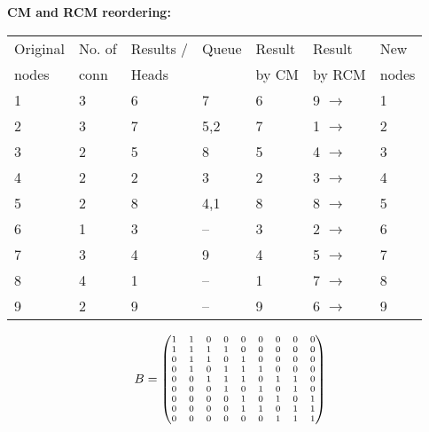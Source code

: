 \begin{enumerate}
    \textbf{CM and RCM reordering:}
    \begin{center}
        \renewcommand{\arraystretch}{0.9}
        \setlength{\tabcolsep}{6pt}
        \begin{tabular}{lllllll}
            Original & No. of & Results / & Queue & Result & Result & New\\
            nodes    & conn   & Heads     &       & by CM  & by RCM & nodes\\
            \hline
            1 & 3 & 6 & 7   & 6 & 9 $\rightarrow$ & 1\rule[1pt]{0pt}{1em}\\
            2 & 3 & 7 & 5,2 & 7 & 1 $\rightarrow$ & 2\\
            3 & 2 & 5 & 8   & 5 & 4 $\rightarrow$ & 3\\
            4 & 2 & 2 & 3   & 2 & 3 $\rightarrow$ & 4\\
            5 & 2 & 8 & 4,1 & 8 & 8 $\rightarrow$ & 5\\
            6 & 1 & 3 & --  & 3 & 2 $\rightarrow$ & 6\\
            7 & 3 & 4 & 9   & 4 & 5 $\rightarrow$ & 7\\
            8 & 4 & 1 & --  & 1 & 7 $\rightarrow$ & 8\\
            9 & 2 & 9 & --  & 9 & 6 $\rightarrow$ & 9\\
        \end{tabular}
    \end{center}
    \begin{minipage}[t]{0.5\linewidth}
        \begin{align*}
            \scriptsize
            B = \begin{pmatrix}
                1 & 1 & 0 & 0 & 0 & 0 & 0 & 0 & 0\\
                1 & 1 & 1 & 1 & 0 & 0 & 0 & 0 & 0\\
                0 & 1 & 1 & 0 & 1 & 0 & 0 & 0 & 0\\
                0 & 1 & 0 & 1 & 1 & 1 & 0 & 0 & 0\\
                0 & 0 & 1 & 1 & 1 & 0 & 1 & 1 & 0\\
                0 & 0 & 0 & 1 & 0 & 1 & 0 & 1 & 0\\
                0 & 0 & 0 & 0 & 1 & 0 & 1 & 0 & 1\\
                0 & 0 & 0 & 0 & 1 & 1 & 0 & 1 & 1\\
                0 & 0 & 0 & 0 & 0 & 0 & 1 & 1 & 1
            \end{pmatrix}
        \end{align*}

\end{minipage}
\end{enumerate}
